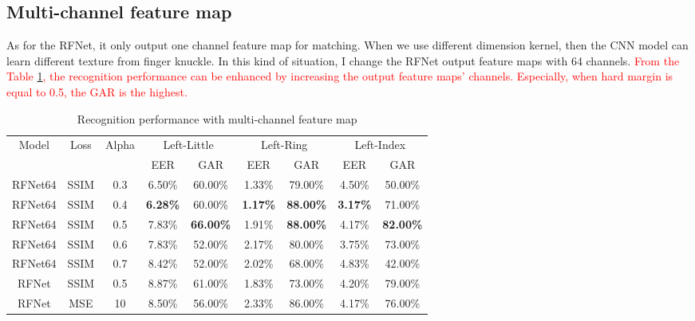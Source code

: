 \subsection{Multi-channel feature map}
As for the RFNet, it only output one channel feature map for matching. When we use different dimension kernel, then the CNN model can learn different texture from finger knuckle. In this kind of situation, I change the RFNet output feature maps with 64 channels. \textcolor{red}{From the Table \ref{multi-channel-ssim}, the recognition performance can be enhanced by increasing the output feature maps' channels. Especially, when hard margin is equal to 0.5, the GAR is the highest.}

\begin{table}[ht]
    \centering
    \caption{Recognition performance with multi-channel feature map}
    \begin{tabular}{ccccccccc}
    \hline
    \multirow{2}{*}{Model} & \multirow{2}{*}{Loss} & \multirow{2}{*}{Alpha} & \multicolumn{2}{c}{Left-Little}    & \multicolumn{2}{c}{Left-Ring}      & \multicolumn{2}{c}{Left-Index}     \\
                           &                       &                        & EER             & GAR              & EER             & GAR              & EER             & GAR              \\ \hline
    RFNet64                & SSIM                  & 0.3                    & 6.50\%          & 60.00\%          & 1.33\%          & 79.00\%          & 4.50\%          & 50.00\%          \\
    RFNet64                & SSIM                  & 0.4                    & \textbf{6.28\%} & 60.00\%          & \textbf{1.17\%} & \textbf{88.00\%} & \textbf{3.17\%} & 71.00\%          \\
    RFNet64                & SSIM                  & 0.5                    & 7.83\%          & \textbf{66.00\%} & 1.91\%          & \textbf{88.00\%} & 4.17\%          & \textbf{82.00\%} \\
    RFNet64                & SSIM                  & 0.6                    & 7.83\%          & 52.00\%          & 2.17\%          & 80.00\%          & 3.75\%          & 73.00\%          \\
    RFNet64                & SSIM                  & 0.7                    & 8.42\%          & 52.00\%          & 2.02\%          & 68.00\%          & 4.83\%          & 42.00\%          \\
    RFNet                  & SSIM                  & 0.5                    & 8.87\%          & 61.00\%          & 1.83\%          & 73.00\%          & 4.20\%          & 79.00\%          \\
    RFNet                  & MSE                   & 10                     & 8.50\%          & 56.00\%          & 2.33\%          & 86.00\%          & 4.17\%          & 76.00\%          \\ \hline
    \end{tabular}
    \label{multi-channel-ssim}
\end{table}

